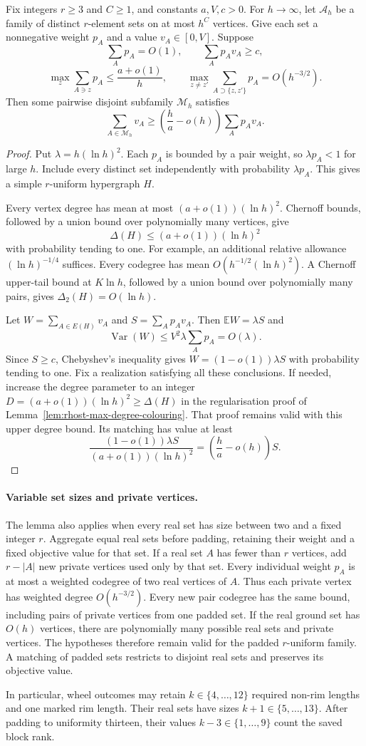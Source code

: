 \begin{lemma}\label{lem:rhost-weighted-matching}
Fix integers $r\ge3$ and $C\ge1$, and constants $a,V,c>0$.
For $h\to\infty$, let $\mathcal A_h$ be a family of distinct $r$-element sets on at most $h^C$ vertices.
Give each set a nonnegative weight $p_A$ and a value $v_A\in[0,V]$.
Suppose
\[
 \sum_Ap_A=O(1),\qquad \sum_Ap_Av_A\ge c,
\]
\[
 \max_z\sum_{A\ni z}p_A\le\frac{a+o(1)}h,
 \qquad
 \max_{z\ne z'}\sum_{A\supset\{z,z'\}}p_A=O(h^{-3/2}).
\]
Then some pairwise disjoint subfamily $\mathcal M_h$ satisfies
\[
 \sum_{A\in\mathcal M_h}v_A
 \ge\left(\frac h a-o(h)\right)\sum_Ap_Av_A.
\]
\end{lemma}

\begin{proof}
Put $\lambda=h(\ln h)^2$.
Each $p_A$ is bounded by a pair weight, so $\lambda p_A<1$ for large $h$.
Include every distinct set independently with probability $\lambda p_A$.
This gives a simple $r$-uniform hypergraph $H$.

Every vertex degree has mean at most $(a+o(1))(\ln h)^2$.
Chernoff bounds, followed by a union bound over polynomially many vertices, give
\[
 \Delta(H)\le(a+o(1))(\ln h)^2
\]
with probability tending to one.
For example, an additional relative allowance $(\ln h)^{-1/4}$ suffices.
Every codegree has mean $O(h^{-1/2}(\ln h)^2)$.
A Chernoff upper-tail bound at $K\ln h$, followed by a union bound over polynomially many pairs, gives
$\Delta_2(H)=O(\ln h)$.

Let $W=\sum_{A\in E(H)}v_A$ and $S=\sum_Ap_Av_A$.
Then $\mathbb EW=\lambda S$ and
\[
 \operatorname{Var}(W)\le V^2\lambda\sum_Ap_A=O(\lambda).
\]
Since $S\ge c$, Chebyshev's inequality gives $W=(1-o(1))\lambda S$ with probability tending to one.
Fix a realization satisfying all these conclusions.
If needed, increase the degree parameter to an integer
$D=(a+o(1))(\ln h)^2\ge\Delta(H)$ in the regularisation proof of Lemma~\ref{lem:rhost-max-degree-colouring}.
That proof remains valid with this upper degree bound.
Its matching has value at least
\[
 \frac{(1-o(1))\lambda S}{(a+o(1))(\ln h)^2}
 =\left(\frac h a-o(h)\right)S.
\]
\end{proof}

\paragraph{Variable set sizes and private vertices.}
The lemma also applies when every real set has size between two and a fixed integer $r$.
Aggregate equal real sets before padding, retaining their weight and a fixed objective value for that set.
If a real set $A$ has fewer than $r$ vertices, add $r-|A|$ new private vertices used only by that set.
Every individual weight $p_A$ is at most a weighted codegree of two real vertices of $A$.
Thus each private vertex has weighted degree $O(h^{-3/2})$.
Every new pair codegree has the same bound, including pairs of private vertices from one padded set.
If the real ground set has $O(h)$ vertices, there are polynomially many possible real sets and private vertices.
The hypotheses therefore remain valid for the padded $r$-uniform family.
A matching of padded sets restricts to disjoint real sets and preserves its objective value.

In particular, wheel outcomes may retain $k\in\{4,\ldots,12\}$ required non-rim lengths and one marked rim length.
Their real sets have sizes $k+1\in\{5,\ldots,13\}$.
After padding to uniformity thirteen, their values $k-3\in\{1,\ldots,9\}$ count the saved block rank.
